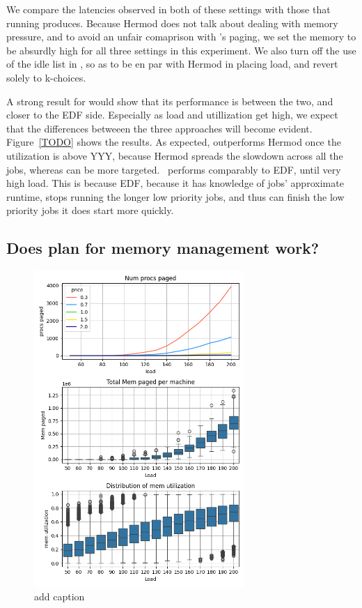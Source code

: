 We compare the latencies observed in both of these settings with those that
running \sys{} produces. Because Hermod does not talk about dealing with memory
pressure, and to avoid an unfair comaprison with \sys{}'s paging, we set the
memory to be absurdly high for all three settings in this experiment. We also
turn off the use of the idle list in \sys{}, so as to be en par with Hermod in
placing load, and revert solely to k-choices.

A strong result for \sys{} would show that its performance is between the two,
and closer to the EDF side. Especially as load and utillization get high, we
expect that the differences betweeen the three approaches will become evident.
Figure~\ref{TODO} shows the results. As expected, \sys{} outperforms Hermod once
the utilization is above YYY, because Hermod spreads the slowdown across all the
jobs, whereas \sys{} can be more targeted.~\sys{} performs comparably to EDF,
until very high load. This is because EDF, because it has knowledge of jobs'
approximate runtime, stops running the longer low priority jobs, and thus can
finish the low priority jobs it does start more quickly.


\subsection{Does \sys{} plan for memory management work?}

\begin{figure}[t!]
    \centering
      \includegraphics[width=8cm]{img/memory_graphs.png}
      \caption{ add caption }
    \label{fig:memory-graphs}
\end{figure}

